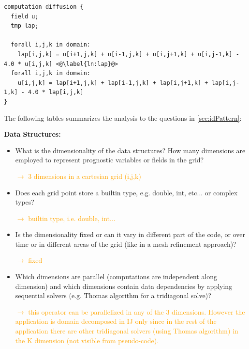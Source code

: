 \documentclass[a4paper,10pt]{scrartcl}
\begin{document}
\begin{lstlisting}[label=lst:diff, caption=pseudo-code for a diffusion operator example]
computation diffusion {
  field u; 
  tmp lap;

  forall i,j,k in domain:
    lap[i,j,k] = u[i+1,j,k] + u[i-1,j,k] + u[i,j+1,k] + u[i,j-1,k] - 4.0 * u[i,j,k] <@\label{ln:lap}@>
  forall i,j,k in domain:
    u[i,j,k] = lap[i+1,j,k] + lap[i-1,j,k] + lap[i,j+1,k] + lap[i,j-1,k] - 4.0 * lap[i,j,k]
}
\end{lstlisting}

The following tables summarizes the analysis to the questions in \cref{sec:idPattern}:

\textbf{Data Structures:}\newline
\begin{itemize}
	\item What is the dimensionality of the data structures? How many dimensions are employed to represent prognostic variables or fields in the grid?
	
	\textcolor{orange}{$\rightarrow$ 3 dimensions in a cartesian grid (i,j,k)}
	
	\item Does each grid point store a builtin type, e.g. double, int, etc... or complex types?
	
	\textcolor{orange}{$\rightarrow$ builtin type, i.e. double, int...}
	
	\item Is the dimensionality fixed or can it vary in different part of the code, or over time or in different areas of the grid (like in a mesh refinement approach)?
	
	\textcolor{orange}{$\rightarrow$ fixed}
	
	\item Which dimensions are parallel (computations are independent along dimension) and which dimensions contain data dependencies by applying sequential solvers (e.g. Thomas algorithm for a tridiagonal solve)?
	
	\textcolor{orange}{$\rightarrow$ this operator can be parallelized in any of the 3 dimensions. However the application is domain decomposed in IJ only since in the rest of the application there are other tridiagonal solvers (using Thomas algorithm) in the K dimension (not visible from pseudo-code).} 
	
\end{itemize}
\end{document}
